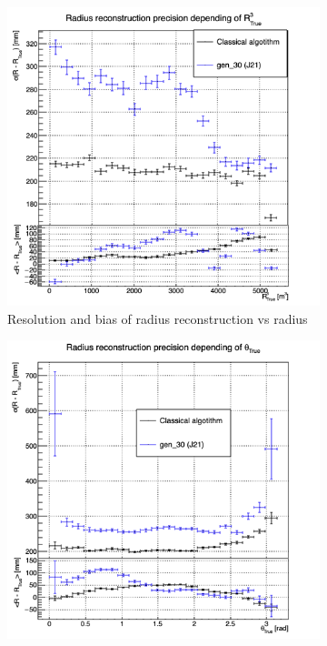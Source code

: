 \begin{figure}[ht]
  \begin{subfigure}[t]{0.32\linewidth}
    \centering
    \includegraphics[width=\linewidth]{images/jcnn/vic_cnn/multi_vic_cnn_MSBvRTC.png}
    \caption{Resolution and bias of radius reconstruction vs radius}
    \label{fig:jcnn:vic_cnn:multi_vic_cnn_MSBvRTC}
  \end{subfigure}
  \begin{subfigure}[t]{0.32\linewidth}
    \centering
    \includegraphics[width=\linewidth]{images/jcnn/vic_cnn/multi_vic_cnn_MSBvTTC.png}

\end{subfigure}
\end{figure}
